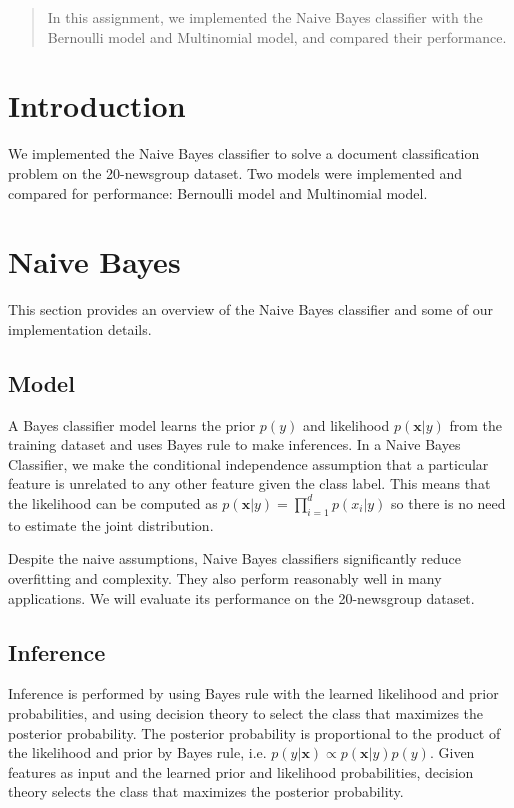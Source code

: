 \documentclass[12pt]{article}
\begin{document}
\maketitle

\begin{abstract}
In this assignment, we implemented the Naive Bayes classifier with the Bernoulli model and Multinomial model, and compared their performance.
\end{abstract}

\section{Introduction}
We implemented the Naive Bayes classifier to solve a document classification problem on the 20-newsgroup dataset. Two models were implemented and compared for performance: Bernoulli model and Multinomial model.

\section{Naive Bayes}
This section provides an overview of the Naive Bayes classifier and some of our implementation details.

\subsection{Model}
A Bayes classifier model learns the prior \(p(y)\) and likelihood \(p(\textbf{x}|y)\) from the training dataset and uses Bayes rule to make inferences. In a Naive Bayes Classifier, we make the conditional independence assumption that a particular feature is unrelated to any other feature given the class label. This means that the likelihood can be computed as \(p(\textbf{x}|y) = \prod_{i=1}^d p(x_i|y)\) so there is no need to estimate the joint distribution.

Despite the naive assumptions, Naive Bayes classifiers significantly reduce overfitting and complexity. They also perform reasonably well in many applications. We will evaluate its performance on the 20-newsgroup dataset.

\subsection{Inference}
Inference is performed by using Bayes rule with the learned likelihood and prior probabilities, and using decision theory to select the class that maximizes the posterior probability. The posterior probability is proportional to the product of the likelihood and prior by Bayes rule, i.e. \(p(y|\textbf{x}) \propto p(\textbf{x}|y) p(y) \). Given features as input and the learned prior and likelihood probabilities, decision theory selects the class that maximizes the posterior probability.
\end{document}
